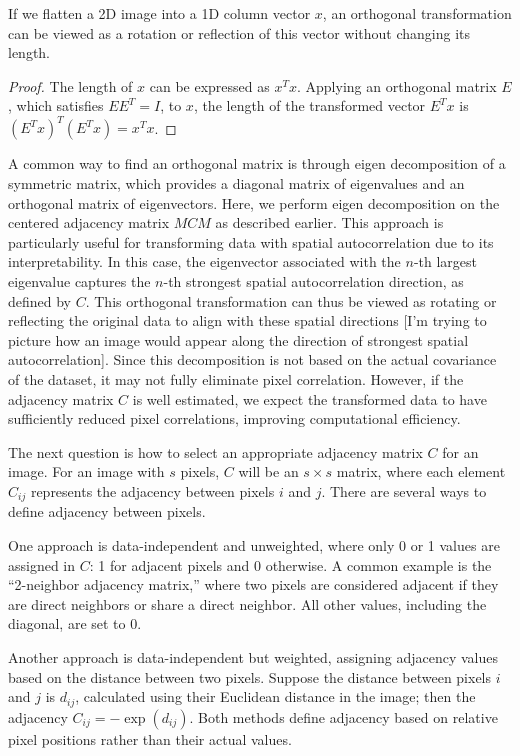 \documentclass[12pt]{article}
\begin{document}
If we flatten a 2D image into a 1D column vector \( x \), an orthogonal transformation can be viewed as a rotation or reflection of this vector without changing its length.
\begin{proof}
  The length of \( x \) can be expressed as \( x^T x \). Applying an orthogonal matrix \( E \), which satisfies \( E E^T = I \), to \( x \), the length of the transformed vector \( E^T x \) is \( (E^T x)^T (E^T x) = x^T x \).
\end{proof}

A common way to find an orthogonal matrix is through eigen decomposition of a symmetric matrix, which provides a diagonal matrix of eigenvalues and an orthogonal matrix of eigenvectors. Here, we perform eigen decomposition on the centered adjacency matrix \( M C M \) as described earlier. This approach is particularly useful for transforming data with spatial autocorrelation due to its interpretability. In this case, the eigenvector associated with the \( n \)-th largest eigenvalue captures the \( n \)-th strongest spatial autocorrelation direction, as defined by \( C \). This orthogonal transformation can thus be viewed as rotating or reflecting the original data to align with these spatial directions [I'm trying to picture how an image would appear along the direction of strongest spatial autocorrelation]. Since this decomposition is not based on the actual covariance of the dataset, it may not fully eliminate pixel correlation. However, if the adjacency matrix \( C \) is well estimated, we expect the transformed data to have sufficiently reduced pixel correlations, improving computational efficiency.

The next question is how to select an appropriate adjacency matrix \( C \) for an image. For an image with \( s \) pixels, \( C \) will be an \( s \times s \) matrix, where each element \( C_{ij} \) represents the adjacency between pixels \( i \) and \( j \). There are several ways to define adjacency between pixels. 

One approach is data-independent and unweighted, where only 0 or 1 values are assigned in \( C \): 1 for adjacent pixels and 0 otherwise. A common example is the “2-neighbor adjacency matrix,” where two pixels are considered adjacent if they are direct neighbors or share a direct neighbor. All other values, including the diagonal, are set to 0.

Another approach is data-independent but weighted, assigning adjacency values based on the distance between two pixels. Suppose the distance between pixels \( i \) and \( j \) is \( d_{ij} \), calculated using their Euclidean distance in the image; then the adjacency \( C_{ij} = - \exp(d_{ij}) \). Both methods define adjacency based on relative pixel positions rather than their actual values.
\end{document}
